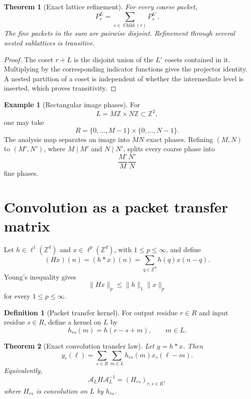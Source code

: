 \documentclass{aomart}
\newtheorem{theorem}{Theorem}[section]
\theoremstyle{definition}
\newtheorem{definition}[definition]{Definition}
\newtheorem{example}[example]{Example}
\theoremstyle{remark}
\newcommand{\ZZ}{\mathbb Z}
\newcommand{\Acal}{\mathcal A}
\begin{document}
\begin{theorem}[Exact lattice refinement]\label{thm:lattice_refinement}
For every coarse packet,
\[
P_r^{L}
=
\sum_{s\in\operatorname{Child}(r)}P_s^{L'}.
\]
The fine packets in the sum are pairwise disjoint. Refinement through several nested sublattices is transitive.
\end{theorem}

\begin{proof}
The coset \(r+L\) is the disjoint union of the \(L'\) cosets contained in it. Multiplying by the corresponding indicator functions gives the projector identity. A nested partition of a coset is independent of whether the intermediate level is inserted, which proves transitivity.
\end{proof}

\begin{example}[Rectangular image phases]\label{ex:image_phases}
For
\[
L=M\ZZ\times N\ZZ\subset\ZZ^2,
\]
one may take
\[
R=\{0,\ldots,M-1\}\times\{0,\ldots,N-1\}.
\]
The analysis map separates an image into \(MN\) exact phases. Refining \((M,N)\) to \((M',N')\), where \(M\mid M'\) and \(N\mid N'\), splits every coarse phase into
\[
\frac{M'}M\frac{N'}N
\]
fine phases.
\end{example}

\section{Convolution as a packet transfer matrix}\label{sec:convolution}

Let \(h\in\ell^1(\ZZ^d)\) and \(x\in\ell^p(\ZZ^d)\), with \(1\leq p\leq\infty\), and define
\[
(Hx)(n)
=(h*x)(n)
=\sum_{q\in\ZZ^d}h(q)x(n-q).
\]
Young's inequality gives
\[
\|Hx\|_p\leq\|h\|_1\|x\|_p
\]
for every \(1\leq p\leq\infty\).

\begin{definition}[Packet transfer kernel]\label{def:packet_transfer_kernel}
For output residue \(r\in R\) and input residue \(s\in R\), define a kernel on \(L\) by
\[
h_{rs}(m)=h(r-s+m),
\qquad
m\in L.
\]
\end{definition}

\begin{theorem}[Exact convolution transfer law]\label{thm:convolution_transfer}
Let \(y=h*x\). Then
\[
y_r(\ell)
=
\sum_{s\in R}\sum_{m\in L}h_{rs}(m)x_s(\ell-m).
\]
Equivalently,
\[
\Acal_LH\Acal_L^{-1}
=
(H_{rs})_{r,s\in R},
\]
where \(H_{rs}\) is convolution on \(L\) by \(h_{rs}\).
\end{theorem}
\end{document}
